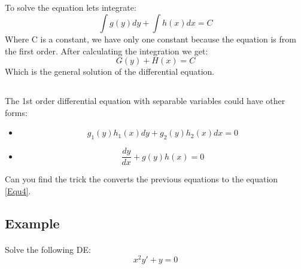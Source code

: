\subsection{}
\begin{frame}
  \frametitle{\insertsectionhead}
  \framesubtitle{\insertsubsectionhead}
  To solve the equation lets integrate:
  \begin{equation*} \tag{5}
    \int g(y)dy + \int h(x)dx = C
  \end{equation*}
  Where C is a constant, we have only one constant because the equation is from the first order.
  After calculating the integration we get:
  \begin{equation*} \tag{6}
    G(y) + H(x) = C
  \end{equation*}
  Which is the general solution of the differential equation.
\end{frame}

\subsection{}
\begin{frame}
  \frametitle{\insertsectionhead}
  \framesubtitle{\insertsubsectionhead}
  The 1st order differential equation with separable variables could have other forms:
  \begin{itemize}
        \item
            \begin{equation*} \tag{7}
                {g_1(y)} {h_1(x)} dy + {g_2(y)}{h_2(x)}dx = 0
            \end{equation*}
        \item \begin{equation*} \tag{8}
                    \frac{dy}{dx} + g(y)h(x) = 0
                \end{equation*}
    \end{itemize}
    Can you find the trick the converts the previous equations to the equation \ref{Equ4}.
\end{frame}

\subsection{Example}
\begin{frame}{
    \insertsectionhead}
    \framesubtitle{\insertsubsectionhead}
    Solve the following DE:
        \begin{equation*} \tag{9}
            {x^2}{y'} + y = 0
        \end{equation*}
        \newline\newline\newline\newline\newline\newline
\end{frame}

